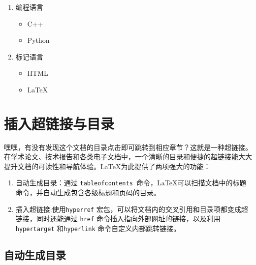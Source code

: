 \begin{enumerate}
    \item 编程语言
    \begin{itemize}
        \item C++
        \item Python
    \end{itemize}
    \item 标记语言
    \begin{itemize}
        \item HTML
        \item \LaTeX
    \end{itemize}
\end{enumerate}

\section{插入超链接与目录}
嘿嘿，有没有发现这个文档的目录点击即可跳转到相应章节？这就是一种超链接。在学术论文、技术报告和各类电子文档中，一个清晰的目录和便捷的超链接能大大提升文档的可读性和导航体验。\LaTeX 为此提供了两项强大的功能：
\begin{enumerate}
	\item 自动生成目录：通过 \texttt{tableofcontents }命令，\LaTeX 可以扫描文档中的标题命令，并自动生成包含各级标题和页码的目录。
	\item 插入超链接:使用\texttt{hyperref}  宏包，可以将文档内的交叉引用和目录项都变成超链接，同时还能通过 \texttt{href} 命令插入指向外部网址的链接，以及利用\texttt{hypertarget}  和\texttt{hyperlink}  命令自定义内部跳转链接。 
\end{enumerate}

\subsection{自动生成目录}
